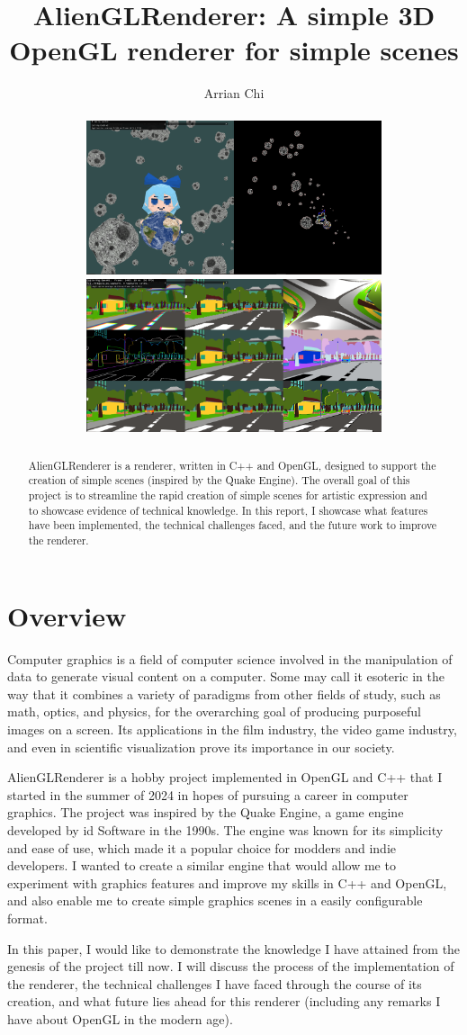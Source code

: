 \documentclass[letterpaper, 10 pt, conference]{ieeeconf}  %
\title{\LARGE \bf
AlienGLRenderer: A simple 3D OpenGL renderer for simple scenes
}
\author{Arrian Chi%
\\
\\ 
\includegraphics[width=8.7cm]{baka1.PNG} \> \includegraphics[width=8.7cm]{baka2.PNG} 
}
\begin{document}


\maketitle
\thispagestyle{empty}
\pagestyle{empty}



\begin{abstract}

AlienGLRenderer is a renderer, written in C++ and OpenGL, designed to support the creation of simple scenes (inspired by the Quake Engine). The overall goal of this project is to streamline the rapid creation of simple scenes for artistic expression and to showcase evidence of technical knowledge. In this report, I showcase what features have been implemented, the technical challenges faced, and the future work to improve the renderer. 

\end{abstract}
\section{Overview}
Computer graphics is a field of computer science involved in the manipulation of data to generate visual content on a computer. Some may call it esoteric in the way that it combines a variety of paradigms from other fields of study, such as math, optics, and physics, for the overarching goal of producing purposeful images on a screen. Its applications in the film industry, the video game industry, and even in scientific visualization prove its importance in our society. 

AlienGLRenderer is a hobby project implemented in OpenGL and C++ that I started in the summer of 2024 in hopes of pursuing a career in computer graphics. The project was inspired by the Quake Engine, a game engine developed by id Software in the 1990s. The engine was known for its simplicity and ease of use, which made it a popular choice for modders and indie developers. I wanted to create a similar engine that would allow me to experiment with graphics features and improve my skills in C++ and OpenGL, and also enable me to create simple graphics scenes in a easily configurable format.

In this paper, I would like to demonstrate the knowledge I have attained from the genesis of the project till now. I will discuss the process of the implementation of the renderer, the technical challenges I have faced through the course of its creation, and what future lies ahead for this renderer (including any remarks I have about OpenGL in the modern age).
\end{document}
